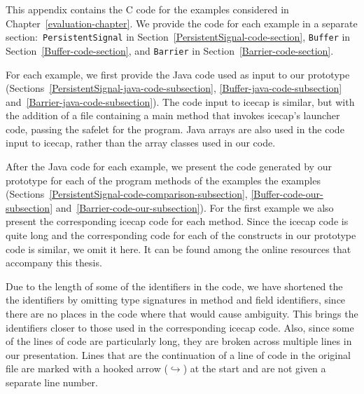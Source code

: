 \renewcommand\#{\char"0023}


This appendix contains the C code for the examples considered in
Chapter~\ref{evaluation-chapter}.
We provide the code for each example in a separate
section:~\texttt{PersistentSignal} in
Section~\ref{PersistentSignal-code-section}, \texttt{Buffer} in
Section~\ref{Buffer-code-section}, and \texttt{Barrier} in
Section~\ref{Barrier-code-section}.

For each example, we first provide the Java code used as input to our
prototype (Sections~\ref{PersistentSignal-java-code-subsection},
\ref{Buffer-java-code-subsection}
and~\ref{Barrier-java-code-subsection}).
The code input to icecap is similar, but with the addition of a file
containing a main method that invokes icecap's launcher code, passing
the safelet for the program.
Java arrays are also used in the code input to icecap, rather than the
array classes used in our code.

After the Java code for each example, we present the code generated by
our prototype for each of the program methods of the examples the
examples (Sections~\ref{PersistentSignal-code-comparison-subsection},
\ref{Buffer-code-our-subsection}
and~\ref{Barrier-code-our-subsection}).
For the first example we also present the corresponding icecap code
for each method.
Since the icecap code is quite long and the corresponding code for
each of the constructs in our prototype code is similar, we omit it
here.
It can be found among the online resources that accompany this thesis.

Due to the length of some of the identifiers in the code, we have
shortened the the identifiers by omitting type signatures in method
and field identifiers, since there are no places in the code where
that would cause ambiguity.
This brings the identifiers closer to those used in the corresponding
icecap code.
Also, since some of the lines of code are particularly long, 
they are broken across multiple lines in our presentation.
Lines that are the continuation of a line of code in the original file
are marked with a hooked arrow (\mbox{$\hookrightarrow$}) at the start
and are not given a separate line number.

